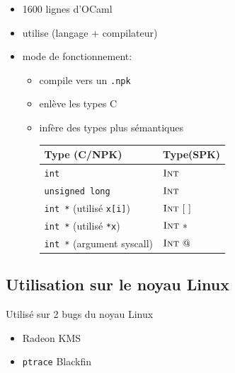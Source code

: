 \documentclass{beamer}
\begin{document}
\begin{frame}

\begin{itemize}
\item 1600 lignes d'OCaml
\item utilise \newspeak (langage + compilateur)
\item mode de fonctionnement:
  \begin{itemize}
  \item compile vers un \texttt{.npk}
  \item enlève les types C
  \item infère des types plus sémantiques

      \begin{tabular}{ll}
          \toprule
          Type (C/NPK) & Type(SPK) \\
          \midrule
          \texttt{int} & $\textsc{Int}$ \\
          \texttt{unsigned long} & $\textsc{Int}$ \\
          \texttt{int *} (utilisé \texttt{x[i]}) & $\textsc{Int}~[~]$ \\
          \texttt{int *} (utilisé \texttt{*x}) & $\textsc{Int}~*$ \\
          \texttt{int *} (argument syscall) & $\textsc{Int}~@$ \\
          \bottomrule
      \end{tabular}
  \end{itemize}
\end{itemize}

\end{frame}

\subsection{Utilisation sur le noyau Linux}

\begin{frame}
    Utilisé sur 2 bugs du noyau Linux

    \begin{itemize}
        \item Radeon KMS
        \item \texttt{ptrace} Blackfin
    \end{itemize}
\end{frame}
\end{document}
